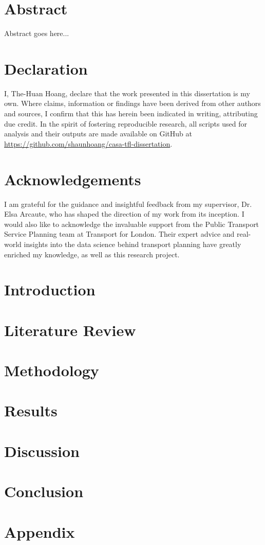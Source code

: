\documentclass[12pt]{report}
\begin{document}


\chapter*{Abstract}
Abstract goes here...

\chapter*{Declaration}
I, The-Huan Hoang, declare that the work presented in this dissertation is my own. Where claims, information or findings have been derived from other authors and sources, I confirm that this has herein been indicated in writing, attributing due credit. In the spirit of fostering reproducible research, all scripts used for analysis and their outputs are made available on GitHub at \url{https://github.com/shaunhoang/casa-tfl-dissertation}.

\chapter*{Acknowledgements}
I am grateful for the guidance and insightful feedback from my supervisor, Dr. Elsa Arcaute, who has shaped the direction of my work from its inception. I would also like to acknowledge the invaluable support from the Public Transport Service Planning team at Transport for London. Their expert advice and real-world insights into the data science behind transport planning have greatly enriched my knowledge, as well as this research project.

\tableofcontents

\listoffigures

\listoftables

\chapter{Introduction}


\chapter{Literature Review}


\chapter{Methodology}


\chapter{Results}


\chapter{Discussion}


\chapter{Conclusion}


\appendix
\chapter{Appendix}


\printbibliography{}
\end{document}
